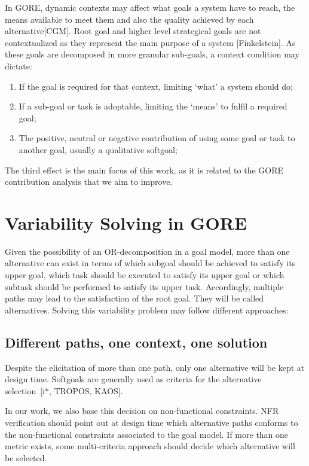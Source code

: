 In GORE, dynamic contexts may affect what goals a system have to reach, the means available to meet them and also the quality achieved by each alternative[CGM]. Root goal and higher level strategical goals are not contextualized as they represent the main purpose of a system [Finkelstein]. As these goals are decomposed in more granular sub-goals, a context condition may dictate:

\begin{enumerate}

\item If the goal is required for that context, limiting `what' a system should do;
\medskip

\item If a sub-goal or task is adoptable, limiting the `means' to fulfil a required goal;
\medskip

\item The positive, neutral or negative contribution of using some goal or task to another goal, usually a qualitative softgoal;

\end{enumerate}

The third effect is the main focus of this work, as it is related to the GORE contribution analysis that we aim to improve.
 

\section{Variability Solving in GORE}

Given the possibility of an OR-decomposition in a goal model, more than one alternative can exist in terms of which subgoal should be achieved to satisfy its upper goal, which task should be executed to satisfy its upper goal or which subtask should be performed to satisfy its upper task. Accordingly, multiple paths may lead to the satisfaction of the root goal. They will be called alternatives. Solving this variability problem may follow different approaches:

\subsection{Different paths, one context, one solution}

Despite the elicitation of more than one path, only one alternative will be kept at design time. Softgoals are generally used as criteria for the alternative selection~[i*, TROPOS, KAOS]. 

In our work, we also base this decision on non-functional constraints. NFR verification should point out at design time which alternative paths conforms to the non-functional constraints associated to the goal model. If more than one metric exists, some multi-criteria approach should decide which alternative will be selected. 

